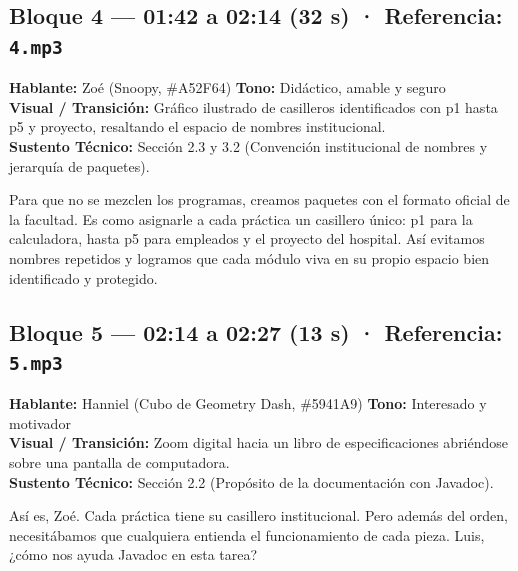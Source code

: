 \documentclass[letterpaper,11pt]{article}
\begin{document}
\subsection*{Bloque 4 — 01:42 a 02:14 (32 s) · Referencia: \texttt{4.mp3}}
\textbf{Hablante:} Zoé \textcolor{colorZoe}{(Snoopy, \#A52F64)} \hfill \textbf{Tono:} Didáctico, amable y seguro\\
\textbf{Visual / Transición:} Gráfico ilustrado de casilleros identificados con p1 hasta p5 y proyecto, resaltando el espacio de nombres institucional.\\
\textbf{Sustento Técnico:} Sección 2.3 y 3.2 (Convención institucional de nombres y jerarquía de paquetes).
\begin{tcolorbox}[colback=colorZoe!5,colframe=colorZoe,title=\textbf{Locución Definitiva — Zoé}]
Para que no se mezclen los programas, creamos paquetes con el formato oficial de la facultad. Es como asignarle a cada práctica un casillero único: p1 para la calculadora, hasta p5 para empleados y el proyecto del hospital. Así evitamos nombres repetidos y logramos que cada módulo viva en su propio espacio bien identificado y protegido.
\end{tcolorbox}

\subsection*{Bloque 5 — 02:14 a 02:27 (13 s) · Referencia: \texttt{5.mp3}}
\textbf{Hablante:} Hanniel \textcolor{colorHanniel}{(Cubo de Geometry Dash, \#5941A9)} \hfill \textbf{Tono:} Interesado y motivador\\
\textbf{Visual / Transición:} Zoom digital hacia un libro de especificaciones abriéndose sobre una pantalla de computadora.\\
\textbf{Sustento Técnico:} Sección 2.2 (Propósito de la documentación con Javadoc).
\begin{tcolorbox}[colback=colorHanniel!5,colframe=colorHanniel,title=\textbf{Locución Definitiva — Hanniel}]
Así es, Zoé. Cada práctica tiene su casillero institucional. Pero además del orden, necesitábamos que cualquiera entienda el funcionamiento de cada pieza. Luis, ¿cómo nos ayuda Javadoc en esta tarea?
\end{tcolorbox}
\end{document}
